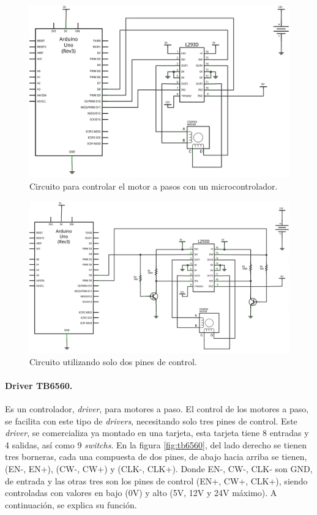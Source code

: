 \begin{figure}[h]
	\centering
	\includegraphics[width=0.7\linewidth]{Imagenes/2/BIPOLAR-4-FILS}
	\caption[Circuito para controlar el motor a pasos con un microcontrolador.]{Circuito para controlar el motor a pasos con un microcontrolador. \cite{Diymakers}}
	\label{fig:bipolar-4-fils}
\end{figure}

\begin{figure}[h]
	\centering
	\includegraphics[width=0.8\linewidth]{Imagenes/2/bipolar-2-fils}
	\caption{Circuito utilizando solo dos pines de control. \cite{Diymakers}}
	\label{fig:bipolar-2-fils}
\end{figure}

\paragraph{Driver TB6560.}
 
Es un controlador, \textit{driver}, para motores a paso. El control de los motores a paso, se facilita con este tipo de \textit{drivers}, necesitando solo tres pines de control. Este \textit{driver}, se comercializa ya montado en una tarjeta, esta tarjeta tiene 8 entradas y 4 salidas, así como 9 \textit{switchs}. En la figura \ref{fig:tb6560}, del lado derecho se tienen tres borneras, cada una compuesta de dos pines, de abajo hacia arriba se tienen, (EN-, EN+), (CW-, CW+) y (CLK-, CLK+). Donde EN-, CW-, CLK- son GND, de entrada y las otras tres son los pines de control (EN+, CW+, CLK+), siendo controladas con valores en bajo (0V) y alto (5V, 12V y 24V máximo). A continuación, se explica su función.

